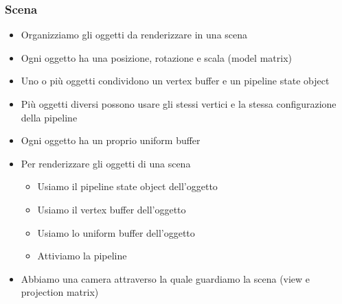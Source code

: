 \begin{frame}
\frametitle{Scena}
\begin{itemize}
\item Organizziamo gli oggetti da renderizzare in una scena
\item Ogni oggetto ha una posizione, rotazione e scala (model matrix)
\item Uno o più oggetti condividono un vertex buffer e un pipeline state object
\item Più oggetti diversi possono usare gli stessi vertici e la stessa configurazione della pipeline
\item Ogni oggetto ha un proprio uniform buffer
\item Per renderizzare gli oggetti di una scena
\begin{itemize}
\item Usiamo il pipeline state object dell'oggetto
\item Usiamo il vertex buffer dell'oggetto
\item Usiamo lo uniform buffer dell'oggetto
\item Attiviamo la pipeline
\end{itemize}
\item Abbiamo una camera attraverso la quale guardiamo la scena (view e projection matrix)
\end{itemize}
\end{frame}

